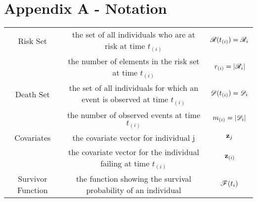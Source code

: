 \section*{Appendix A - Notation}

\begin{tabular}{|c|c|c|}
    \hline
    Risk Set & the set of all individuals who are at risk at time $t_{(i)}$ & $\mathscr{R}(t_{(i)})=\mathscr{R}_i$\\
    & the number of elements in the risk set at time $t_{(i)}$ & $r_{(i)}=|\mathscr{R}_i|$ \\
    \hline
    Death Set & the set of all individuals for which an event is observed at time $t_{(i)}$ & $\mathscr{D}(t_{(i)})=\mathscr{D}_i$\\
    & the number of observed events at time $t_{(i)}$ & $m_{(i)}=|\mathscr{D}_i|$\\
    \hline
    Covariates & the covariate vector for individual j & $\textbf{z}_j$\\
    & the covariate vector for the individual failing at time $t_{(i)}$ & $\textbf{z}_{(i)}$\\
    \hline
    Survivor Function & the function showing the survival probability of an individual & $\mathscr{F}(t_i)$\\
\end{tabular}